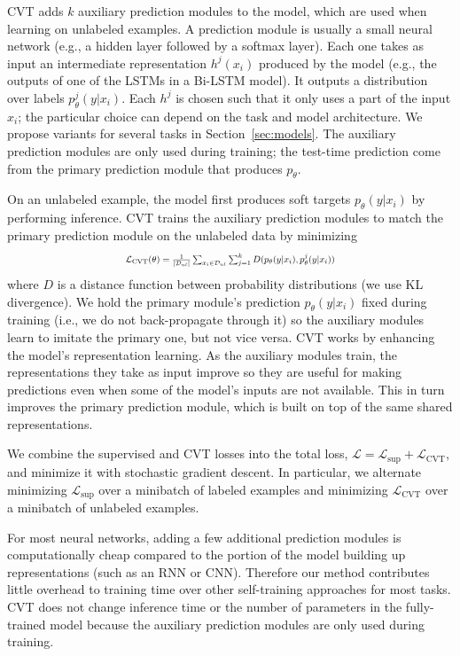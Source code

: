 \documentclass[11pt,a4paper]{article}
\newcommand{\loss} { \mathcal{L} }
\newcommand{\lsup} { \loss_\text{sup} }
\newcommand{\lunsup} { \loss_\text{CVT} }
\newcommand{\model}[1]{ p_\theta(y|#1) }
\newcommand{\modelj}[1]{ p^j_\theta(y|#1) }
\newcommand{\udata} {\mathcal{D}_{ul}}
\newcommand{\D} {D}
\begin{document}
CVT adds $k$ auxiliary prediction modules to the model, which are used when learning on unlabeled examples.
A prediction module is usually a small neural network (e.g., a hidden layer followed by a softmax layer). 
Each one takes as input an intermediate representation $h^j(x_i)$ produced by the model (e.g., the outputs of one of the LSTMs in a Bi-LSTM model).
It outputs a distribution over labels $\modelj{x_i}$.
Each $h^j$ is chosen such that it only uses a part of the input $x_i$; the particular choice can depend on the task and model architecture.
We propose variants for several tasks in Section~\ref{sec:models}. 
The auxiliary prediction modules are only used during training; the test-time prediction come from the primary prediction module that produces $p_\theta$.

On an unlabeled example, the model first produces soft targets $\model{x_i}$ by performing inference. 
CVT trains the auxiliary prediction modules to match the primary prediction module on the unlabeled data by minimizing
\begin{align*}
	\resizebox{0.49\textwidth}{!}{$\lunsup(\theta) = \frac{1}{|\udata|}
	 \sum_{x_i \in \udata} \sum_{j = 1}^k \D(\model{x_i}, \modelj{x_i})$} 
\end{align*}
where $D$ is a distance function between probability distributions  (we use KL divergence).
We hold the primary module's prediction $\model{x_i}$ fixed during training (i.e., we do not back-propagate through it) so the auxiliary modules learn to imitate the primary one, but not vice versa. CVT works by enhancing the model's representation learning. As the auxiliary modules train, the representations they take as input improve so they are useful for making predictions even when some of the model's inputs are not available.
This in turn improves the primary prediction module, which is built on top of the same shared representations.

We combine the supervised and CVT losses into the total loss, $\loss = \lsup + \lunsup$, and minimize it with stochastic gradient descent. 
In particular, we alternate minimizing $\lsup$ over a minibatch of labeled examples and minimizing $\lunsup$ over a minibatch of unlabeled examples.

For most neural networks, adding a few additional prediction modules is computationally cheap compared to the portion of the model building up representations (such as an RNN or CNN).
Therefore our method contributes little overhead to training time over other self-training approaches for most tasks. CVT does not change inference time or the number of parameters in the fully-trained model because the auxiliary prediction modules are only used during training. 
\end{document}
